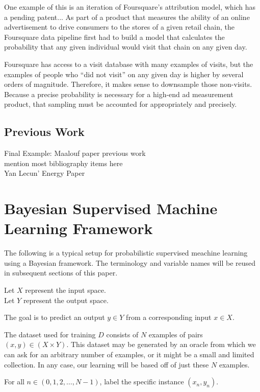 \documentclass[twoside]{article}
\begin{document}
One example of this is an iteration of Foursquare’s attribution model, which has a pending patent\cite{visitprediction}... As part of a product that measures the ability of an online advertisement to drive consumers to the stores of a given retail chain, the Foursquare data pipeline first had to build a model that calculates the probability that any given individual would visit that chain on any given day.

Foursquare has access to a visit database with many examples of visits, but the examples of people who “did not visit” on any given day is higher by several orders of magnitude. Therefore, it makes sense to downsample those non-visits. Because a precise probability is necessary for a high-end ad measurement product, that sampling must be accounted for appropriately and precisely.

\subsection{Previous Work}

Final Example: Maalouf paper
previous work \\
mention most bibliography items here \\
Yan Lecun' Energy Paper

\section{Bayesian Supervised Machine Learning Framework} \label{framework}

The following is a typical setup for probabilistic supervised meachine learning using a Bayesian framework. The terminology and variable names will be reused in subsequent sections of this paper.

Let \(X\) represent the input space. \\
Let \(Y\) represent the output space.

The goal is to predict an output \(y \in Y\) from a corresponding input \(x \in X\).

The dataset used for training \(D\) consists of \(N\) examples of pairs \((x, y) \in (X \times Y) \).  This dataset may be generated by an oracle from which we can ask for an arbitrary number of examples, or it might be a small and limited collection. In any case, our learning will be based off of just these \(N\) examples.

For all \(n \in (0, 1, 2,\ldots,N-1)\), label the specific instance \((x_n, y_n)\).
\end{document}
